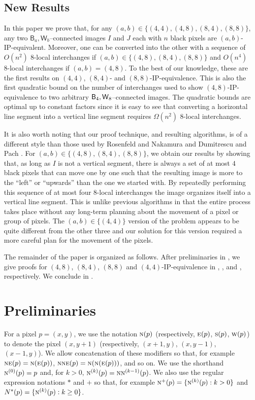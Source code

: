 \documentclass[lotsofwhite,charterfonts]{patmorin}
\newcommand{\foureight}{\ensuremath{\protect\textup{\textsf{B}}_{4},\protect\textup{\textsf{W}}_{8}}}
\newcommand{\N}{\textsc{n}}
\newcommand{\NE}{\textsc{ne}}
\newcommand{\E}{\textsc{e}}
\renewcommand{\S}{\textsc{s}}
\newcommand{\W}{\textsc{w}}
\begin{document}
\subsection{New Results}

In this paper we prove that, for any $(a,b)\in\{(4,4),(4,8),(8,4),(8,8)\}$,
any two $\textsf{B}_a,\textsf{W}_b$--connected images $I$ and $J$ each with $n$ black pixels are $(a,b)$-IP-equivalent. Moreover, one can be converted into the other with a sequence of $O(n^2)$ 8-local interchanges if $(a,b)\in\{(4,8),(8,4),(8,8)\}$ and $O(n^4)$ 8-local interchanges if $(a,b)=(4,8)$. To the best of
our knowledge, these are the first results on $(4,4)$, $(8,4)$- and
$(8,8)$-IP-equivalence. This is also the first quadratic bound on the
number of interchanges used to show $(4,8)$-IP-equivalence to two
arbitrary \foureight--connected images.  The quadratic bounds are optimal up to
constant factors since it is easy to see that converting a horizontal
line segment into a vertical line segment requires $\Omega(n^2)$
8-local interchanges.

It is also worth noting that our proof technique, and resulting
algorithms, is of a different style than those used by Rosenfeld and
Nakamura \cite{rn02} and Dumitrescu and Pach \cite{dp04}. For $(a,b)\in\{(4,8),(8,4),(8,8)\}$, we obtain
our results by showing that, as long as $I$ is not a vertical segment, there is always a set of at most $4$ black pixels that can move one by one such that the resulting image is more to the ``left'' or ``upwards'' than the one we started with. By repeatedly performing this sequence of at most four $8$-local interchanges the image organizes itself into a vertical line segment.  This is unlike
previous algorithms \cite{dp04,rn02} in that the entire process takes
place without any long-term planning about the movement of a pixel or
group of pixels. The $(a,b)\in\{(4,4)\}$ version of the problem appears to be quite different from the other three and our solution for this version required a more careful plan for the movement of the pixels. 

The remainder of the paper is organized as follows. After preliminaries in , we give proofs for $(4,8)$, $(8,4)$, $(8,8)$ and $(4,4)$-IP-equivalence in , ,  and , respectively. We conclude in .



\section{Preliminaries}
For a pixel $p=(x,y)$, we use the notation $\N(p)$ (respectively,
$\E(p)$, $\S(p)$, $\W(p)$) to denote the pixel $(x,y+1)$
(respectively, $(x+1,y)$, $(x,y-1)$, $(x-1,y)$).  We allow
concatenation of these modifiers so that, for example
$\NE(p)=\N(\E(p))$, $\N\NE(p)=\N(\N(\E(p)))$, and so on.  We use the
shorthand $\N^{(0)}(p)=p$ and, for $k>0$,
$\N^{(k)}(p)=\N\N^{(k-1)}(p)$.  We also use the regular expression
notations $*$ and $+$ so that, for example $\N^+(p)=\{\N^{(k)}(p):
k>0\}$ and $N^*(p)=\{\N^{(k)}(p): k\ge 0\}$.
 
\end{document}
